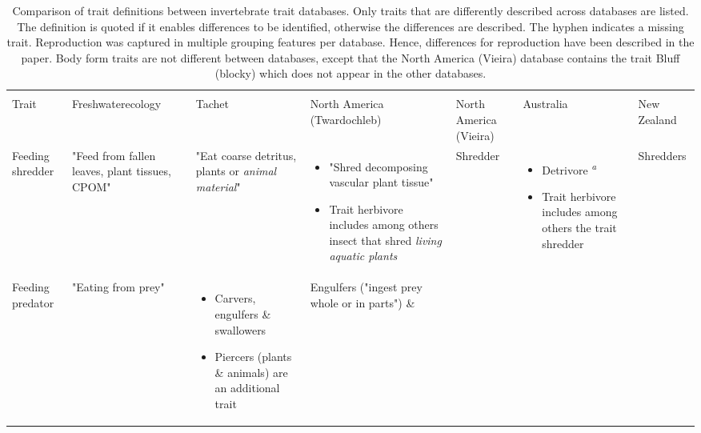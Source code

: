 \documentclass[../Draft_harmonization_paper.tex]{subfiles}
\begin{document}
\begin{landscape}
    \begin{longtable}{m{1.7cm}|m{3cm}|m{3cm}|m{3cm}|m{3cm}|m{3cm}|m{3cm}}
        \caption{Comparison of trait definitions between invertebrate trait databases. Only traits that are differently described across databases are listed. The definition is quoted if it enables differences to be identified, otherwise the differences are described. The hyphen indicates a missing trait. Reproduction was captured in multiple grouping features per database. Hence, differences for reproduction have been described in the paper. Body form traits are not different between databases, except that the North America (Vieira) database contains the trait Bluff (blocky) which does not appear in the other databases.}
        \label{tab:trait_definitions}
        \endfirsthead
        \\
        Trait & Freshwaterecology & Tachet & \specialcell{North America \\ (Twardochleb)} & 
        North America (Vieira) & Australia & New Zealand \\
        \toprule[.1em]
        Feeding shredder & 
        "Feed from fallen leaves, plant tissues, CPOM" & 
        "Eat coarse detritus, plants or \textit{animal material}" & 
        \begin{itemize}
            \item "Shred decomposing vascular plant tissue"
            \item Trait herbivore includes among others insect that shred \textit{living aquatic plants} 
        \end{itemize} & 
        Shredder & 
        \begin{itemize}
            \item Detrivore \textsuperscript{\textit{a}}
            \item Trait herbivore includes among others the trait shredder
        \end{itemize} & 
        Shredders
        \\ 
        \midrule
        Feeding predator & 
        "Eating from prey" & 
        \begin{itemize}
            \item Carvers, engulfers \& swallowers
            \item Piercers (plants \& animals) are an additional trait
        \end{itemize} & %
        Engulfers ("ingest prey whole or in parts") \& 

\end{longtable}
\end{landscape}
\end{document}
